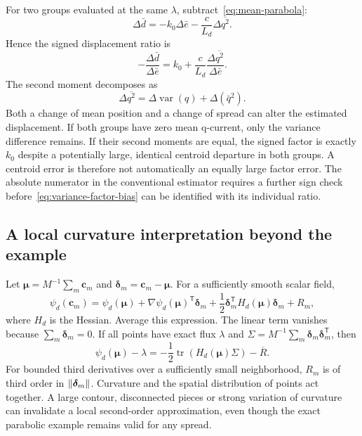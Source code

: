 For two groups evaluated at the same $\lambda$, subtract~\eqref{eq:mean-parabola}:
\begin{equation}
\Delta\bar d=-k_0\Delta\bar e
-\frac{c}{L_d}\Delta\overline{q^2}.
\end{equation}
Hence the signed displacement ratio is
\begin{equation}\label{eq:variance-factor-bias}
-\frac{\Delta\bar d}{\Delta\bar e}
=k_0+\frac{c}{L_d}
\frac{\Delta\overline{q^2}}{\Delta\bar e}.
\end{equation}
The second moment decomposes as
\begin{equation}
\Delta\overline{q^2}
=\Delta\operatorname{var}(q)+\Delta(\bar q^2).
\end{equation}
Both a change of mean position and a change of spread can alter the estimated displacement. If both groups have zero mean q-current, only the variance difference remains. If their second moments are equal, the signed factor is exactly $k_0$ despite a potentially large, identical centroid departure in both groups. A centroid error is therefore not automatically an equally large factor error. The absolute numerator in the conventional estimator requires a further sign check before~\eqref{eq:variance-factor-bias} can be identified with its individual ratio.

\subsection{A local curvature interpretation beyond the example}
Let $\bm\mu=M^{-1}\sum_m\bm c_m$ and $\bm\delta_m=\bm c_m-\bm\mu$. For a sufficiently smooth scalar field,
\begin{equation}
\psi_d(\bm c_m)=\psi_d(\bm\mu)
+\nabla\psi_d(\bm\mu)^{\mathsf T}\bm\delta_m
+\frac12\bm\delta_m^{\mathsf T}H_d(\bm\mu)\bm\delta_m
+R_m,
\end{equation}
where $H_d$ is the Hessian. Average this expression. The linear term vanishes because $\sum_m\bm\delta_m=0$. If all points have exact flux $\lambda$ and
$\Sigma=M^{-1}\sum_m\bm\delta_m\bm\delta_m^{\mathsf T}$, then
\begin{equation}\label{eq:hessian-centroid}
\psi_d(\bm\mu)-\lambda
=-\frac12\operatorname{tr}(H_d(\bm\mu)\Sigma)-\overline R.
\end{equation}
For bounded third derivatives over a sufficiently small neighborhood, $R_m$ is of third order in $\left\lVert\bm\delta_m\right\rVert$. Curvature and the spatial distribution of points act together. A large contour, disconnected pieces or strong variation of curvature can invalidate a local second-order approximation, even though the exact parabolic example remains valid for any spread.

